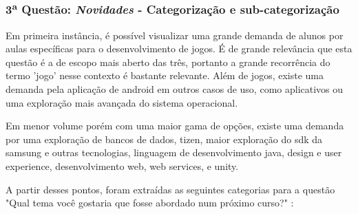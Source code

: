 

\subsubsection*{3\textsuperscript{a} Questão: \textit{Novidades} - Categorização e sub-categorização }

Em primeira instância, é possível visualizar uma grande demanda de alunos por aulas específicas para o desenvolvimento de jogos. É de grande relevância que esta questão é a de escopo mais aberto das três, portanto a grande recorrência do termo 'jogo' nesse contexto é bastante relevante. Além de jogos, existe uma demanda pela aplicação de android em outros casos de uso, como aplicativos ou uma exploração mais avançada do sistema operacional. 

Em menor volume porém com uma maior gama de opções, existe uma demanda por uma exploração de bancos de dados, tizen, maior exploração do sdk da samsung e outras tecnologias, linguagem de desenvolvimento java, design e user experience, desenvolvimento web, web services, e unity. 

A partir desses pontos, foram extraídas as seguintes categorias para a questão "Qual tema você gostaria que fosse abordado num próximo curso?" :

